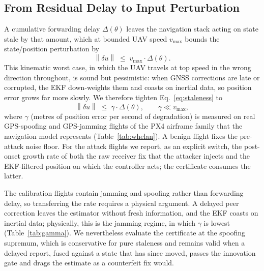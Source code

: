 \documentclass[conference,letterpaper,10pt]{IEEEtran}   %
\newcommand{\dataset}[1]{\textsc{#1}}
\newcommand{\Norm}[1]{\left\lVert #1\right\rVert}
\begin{document}
\subsection{From Residual Delay to Input Perturbation}
A cumulative forwarding delay $\Delta(\theta)$ leaves the navigation stack
acting on state stale by that amount, which at bounded UAV speed $v_{\max}$
bounds the state/position perturbation by
\begin{equation}
\label{eq:staleness}
\Norm{\delta u} \;\le\; v_{\max}\cdot \Delta(\theta).
\end{equation}
This kinematic worst case, in which the UAV travels at top speed in the
wrong direction throughout, is sound but pessimistic: when GNSS corrections are
late or corrupted, the EKF down-weights them and coasts on inertial data, so
position error grows far more slowly. We therefore tighten
Eq.~\eqref{eq:staleness} to
\begin{equation}
\label{eq:gamma}
\Norm{\delta u}\;\le\;\gamma\cdot\Delta(\theta),\qquad \gamma\ll v_{\max},
\end{equation}
where $\gamma$ (metres of position error per second of degradation) is measured
on real GPS-spoofing and GPS-jamming flights of the PX4 airframe family that
the navigation model represents (Table~\ref{tab:whelan}). A benign flight fixes
the pre-attack noise floor. For the attack flights we report, as an explicit
switch, the post-onset growth rate of both the raw receiver fix that the
attacker injects and the EKF-filtered position on which the controller acts;
the certificate consumes the latter.

The calibration flights contain jamming and spoofing rather than forwarding
delay, so transferring the rate requires a physical argument. A delayed peer
correction leaves the estimator without fresh information, and the EKF coasts
on inertial data; physically, this is the jamming regime, in which $\gamma$ is
lowest (Table~\ref{tab:gamma}). We nevertheless evaluate the certificate at the
spoofing supremum, which is conservative for pure staleness and remains valid
when a delayed report, fused against a state that has since moved, passes the
innovation gate and drags the estimate as a counterfeit fix would.

\begin{table}[t]
\centering
\caption{The measured delay-to-position rate $\gamma$ from three real PX4
flights (one benign reference, one GPS-jamming, one GPS-spoofing) in the
\dataset{UAV Attack Dataset}, self-referenced to the pre-attack median.
``noise'' is the $95$th percentile of pre-attack position error;
$\gamma_{\mathrm{lsq}}$ and $\gamma_{\mathrm{peak}}$ are the least-squares and
peak-secant growth rates after attack onset. The flights serve as same-platform
calibration data for $\gamma$; they are not released as pairing records
(\S\ref{sec:provenance_dist}).}
\label{tab:whelan}
\scriptsize
\renewcommand{\arraystretch}{1.1}

\end{table}
\end{document}
